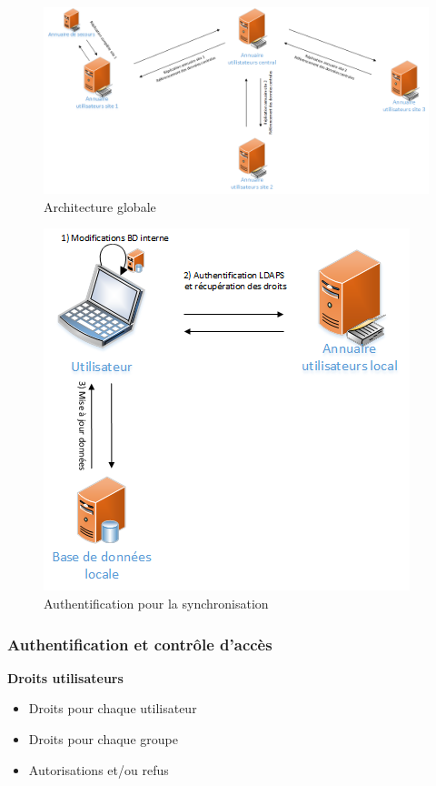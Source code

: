   \begin{figure}[htbp]
	\centering
	\includegraphics[scale=0.4]{Images/SchemaGlobal.png}
	\caption{Architecture globale}
	\label{SchemaGlobal}
\end{figure}

\begin{figure}[htbp]
	\centering
	\includegraphics[scale=0.6]{Images/SchemaAuthentification.png}
	\caption{Authentification pour la synchronisation}
	\label{SchemaAuthentification}
\end{figure}

\begin{frame}
  \frametitle{Authentification et contrôle d'accès}
  \begin{block}{\textbf{Droits utilisateurs}}
  \begin{itemize}
  \item Droits pour chaque utilisateur
  \item Droits pour chaque groupe
  \item Autorisations et/ou refus
  \end{itemize}
  \end{block}
\end{frame}


